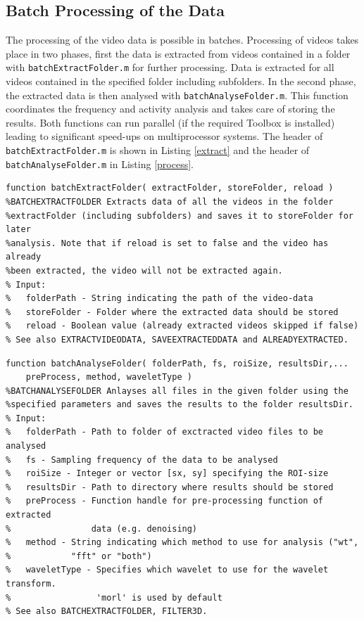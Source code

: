 \documentclass[11pt]{scrartcl}
\begin{document}
\subsection{Batch Processing of the Data}

The processing of the video data is possible in batches. Processing of videos takes place in two phases, first the data is extracted from videos contained in a folder with \texttt{batchExtractFolder.m} for further processing. Data is extracted for all videos contained in the specified folder including subfolders. In the second phase, the extracted data is then analysed with \texttt{batchAnalyseFolder.m}. This function coordinates the frequency and activity analysis and takes care of storing the results. Both functions can run parallel (if the required Toolbox is installed) leading to significant speed-ups on multiprocessor systems. The header of \texttt{batchExtractFolder.m} is shown in Listing \ref{extract} and the header of \texttt{batchAnalyseFolder.m} in Listing \ref{process}.


\begin{minipage}{\linewidth}
  \begin{lstlisting}[caption={Function for extracting data from videos.}, label=extract]
function batchExtractFolder( extractFolder, storeFolder, reload )
%BATCHEXTRACTFOLDER Extracts data of all the videos in the folder 
%extractFolder (including subfolders) and saves it to storeFolder for later 
%analysis. Note that if reload is set to false and the video has already 
%been extracted, the video will not be extracted again.
% Input:
%   folderPath - String indicating the path of the video-data
%   storeFolder - Folder where the extracted data should be stored
%   reload - Boolean value (already extracted videos skipped if false)
% See also EXTRACTVIDEODATA, SAVEEXTRACTEDDATA and ALREADYEXTRACTED.
\end{lstlisting}
\end{minipage}

\begin{minipage}{\linewidth}
  \begin{lstlisting}[caption={Function for analysing extracted data.}, label=process]
function batchAnalyseFolder( folderPath, fs, roiSize, resultsDir,...
    preProcess, method, waveletType )
%BATCHANALYSEFOLDER Anlayses all files in the given folder using the
%specified parameters and saves the results to the folder resultsDir.
% Input:
%   folderPath - Path to folder of exctracted video files to be analysed
%   fs - Sampling frequency of the data to be analysed
%   roiSize - Integer or vector [sx, sy] specifying the ROI-size
%   resultsDir - Path to directory where results should be stored
%   preProcess - Function handle for pre-processing function of extracted
%                data (e.g. denoising)
%   method - String indicating which method to use for analysis ("wt",
%            "fft" or "both")
%   waveletType - Specifies which wavelet to use for the wavelet transform.
%                 'morl' is used by default
% See also BATCHEXTRACTFOLDER, FILTER3D.
\end{lstlisting}
\end{minipage}
\end{document}
